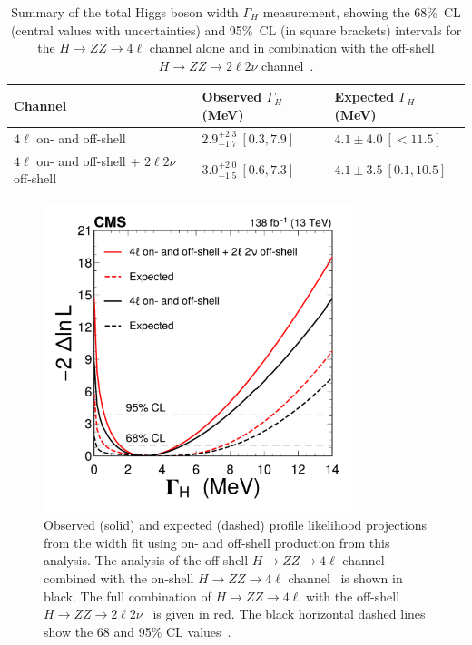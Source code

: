 \begin{table}[!thb]
    \centering
    \begin{tabular}{lll}
        Channel     & Observed $\Gamma_H$ (MeV)        &  Expected $\Gamma_H$ (MeV)  \\
        \hline
        $4\ell$ on- and off-shell    & $2.9^{+2.3}_{-1.7} \ [0.3,7.9]$ & $4.1\pm 4.0 \ [<11.5 ]$ \\
        $4\ell$ on- and off-shell  + $2\ell2\nu$ off-shell  & $3.0^{+ 2.0 }_{- 1.5 }  \ [0.6, 7.3]$ & $4.1\pm3.5 \ [0.1,10.5]$ \\
    \end{tabular}
    \caption{Summary of the total Higgs boson width $\Gamma_H$ measurement, showing the 68\%~CL (central values with uncertainties)
    and 95\%~CL (in square brackets) intervals for the $H \to ZZ \to 4 \ell$ channel alone and in combination with the off-shell $H \to ZZ \to 2 \ell 2 \nu$ channel~\cite{PhysRevD.111.092014}.}
    \label{table:widthoffshellcomb}
\end{table}

\begin{figure}[!hbt]
    \centering
    \includegraphics[width=0.8\textwidth]{figures/Figure_011.pdf}  
    \caption{
        Observed (solid) and expected (dashed) profile likelihood projections from the \Hboson width fit using on- and off-shell production from this analysis. The analysis of the off-shell $H\to ZZ\to4\ell$ channel combined with the on-shell $H\to ZZ\to4\ell$ channel~\cite{CMS:2021nnc} is shown in black. The full combination of $H\to ZZ\to4\ell$ with the off-shell $H\to ZZ\to2\ell2\nu$~\cite{CMS:2022ley} is given in red. The black horizontal dashed lines show the 68 and 95\% CL values~\cite{PhysRevD.111.092014}.}
    \label{fig:widthscan} 
\end{figure}


